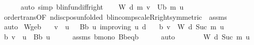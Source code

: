 \begin{isabellebody}
\ \ \ \ \isamarkupfalse%
\ {\isacharparenleft}{\kern0pt}auto\ simp{\isacharcolon}{\kern0pt}\ blinfun{\isachardot}{\kern0pt}diff{\isacharunderscore}{\kern0pt}right{\isacharparenright}{\kern0pt}\isanewline
\ \ \isamarkupfalse%
\ {\isachardoublequoteopen}W\ d\ m\ v\ {\isasymle}\ U\isactrlsub b\ m\ u{\isachardoublequoteclose}\isanewline
\ \ \ \ \isamarkupfalse%
\ order{\isachardot}{\kern0pt}trans{\isacharbrackleft}{\kern0pt}OF\ {\isasymP}n{\isacharunderscore}{\kern0pt}disc{\isacharunderscore}{\kern0pt}pos{\isacharbrackleft}{\kern0pt}unfolded\ blincomp{\isacharunderscore}{\kern0pt}scaleR{\isacharunderscore}{\kern0pt}right{\isacharbrackleft}{\kern0pt}symmetric{\isacharbrackright}{\kern0pt}{\isacharbrackright}{\kern0pt}\ {\isacharasterisk}{\kern0pt}{\isacharbrackright}{\kern0pt}\ assms\isanewline
\ \ \ \ \isamarkupfalse%
\ auto\isanewline
{}\isamarkupfalse%
%
\endisatagproof
{\isafoldproof}%
%
\isadelimproof
\isanewline
%
\endisadelimproof
\isanewline
{}\isamarkupfalse%
\ W{\isacharunderscore}{\kern0pt}ge{\isacharunderscore}{\kern0pt}{\isasymL}\isactrlsub b{\isacharcolon}{\kern0pt}\isanewline
\ \ \ {\isachardoublequoteopen}v\ {\isasymle}\ u{\isachardoublequoteclose}\ {\isachardoublequoteopen}{}\ {\isasymle}\ B\isactrlsub b\ u{\isachardoublequoteclose}\ {\isachardoublequoteopen}{\isasymnu}{\isacharunderscore}{\kern0pt}improving\ u\ d{\isacharprime}{\kern0pt}{\isachardoublequoteclose}\isanewline
\ \ \ {\isachardoublequoteopen}{\isasymL}\isactrlsub b\ v\ {\isasymle}\ W\ d{\isacharprime}{\kern0pt}\ {\isacharparenleft}{\kern0pt}Suc\ m{\isacharparenright}{\kern0pt}\ u{\isachardoublequoteclose}\isanewline
%
\isadelimproof
%
\endisadelimproof
%
\isatagproof
{}\isamarkupfalse%
\ {\isacharminus}{\kern0pt}\isanewline
\ \ \isamarkupfalse%
\ {\isachardoublequoteopen}{\isasymL}\isactrlsub b\ v\ {\isasymle}\ u\ {\isacharplus}{\kern0pt}\ B\isactrlsub b\ u{\isachardoublequoteclose}\isanewline
\ \ \ \ \isamarkupfalse%
\ assms{\isacharparenleft}{\kern0pt}{}{\isacharparenright}{\kern0pt}\ {\isasymL}\isactrlsub b{\isacharunderscore}{\kern0pt}mono\ B\isactrlsub b{\isacharunderscore}{\kern0pt}eq{\isacharunderscore}{\kern0pt}{\isasymL}\isactrlsub b\isanewline
\ \ \ \ \isamarkupfalse%
\ auto\isanewline
\ \ \isamarkupfalse%
\ \isamarkupfalse%
\ {\isachardoublequoteopen}{\isasymdots}\ {\isasymle}\ W\ d{\isacharprime}{\kern0pt}\ {\isacharparenleft}{\kern0pt}Suc\ m{\isacharparenright}{\kern0pt}\ u{\isachardoublequoteclose}\isanewline

\end{isabellebody}

